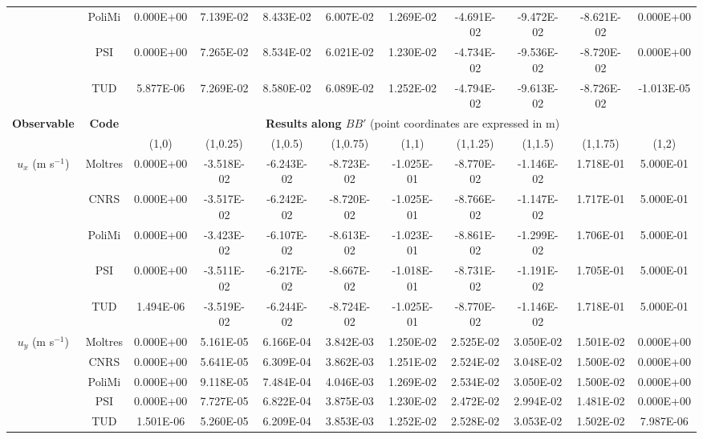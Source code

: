\begin{table}[htbp!]
\begin{tabular}{c c c c c c c c c c c}
        & PoliMi & 0.000E+00 & 7.139E-02 & 8.433E-02 & 6.007E-02 & 1.269E-02 & -4.691E-02 & -9.472E-02 & -8.621E-02 & 0.000E+00 \\
        & PSI & 0.000E+00 & 7.265E-02 & 8.534E-02 & 6.021E-02 & 1.230E-02 & -4.734E-02 & -9.536E-02 & -8.720E-02 & 0.000E+00 \\
        & TUD & 5.877E-06 & 7.269E-02 & 8.580E-02 & 6.089E-02 & 1.252E-02 & -4.794E-02 & -9.613E-02 & -8.726E-02 & -1.013E-05 \\
		\midrule
		\midrule
		\multirow{2}{*}{\textbf{Observable}} & \multirow{2}{*}{\textbf{Code}} & \multicolumn{9}{c}{\textbf{Results along $BB'$} (point coordinates are expressed in m)} \\
		& & {(1,0)} & {(1,0.25)} & {(1,0.5)} & {(1,0.75)} & {(1,1)} & {(1,1.25)} & {(1,1.5)} & {(1,1.75)} & {(1,2)} \\
		\midrule
		\multirow{5}{*}{$u_x$ (m s$^{-1}$)} & Moltres & 0.000E+00 & -3.518E-02 & -6.243E-02 & -8.723E-02 & -1.025E-01 & -8.770E-02 & -1.146E-02 & 1.718E-01 & 5.000E-01 \\
		& CNRS & 0.000E+00 & -3.517E-02 & -6.242E-02 & -8.720E-02 & -1.025E-01 & -8.766E-02 & -1.147E-02 & 1.717E-01 & 5.000E-01 \\
        & PoliMi & 0.000E+00 & -3.423E-02 & -6.107E-02 & -8.613E-02 & -1.023E-01 & -8.861E-02 & -1.299E-02 & 1.706E-01 & 5.000E-01 \\
        & PSI & 0.000E+00 & -3.511E-02 & -6.217E-02 & -8.667E-02 & -1.018E-01 & -8.731E-02 & -1.191E-02 & 1.705E-01 & 5.000E-01 \\
        & TUD & 1.494E-06 & -3.519E-02 & -6.244E-02 & -8.724E-02 & -1.025E-01 & -8.770E-02 & -1.146E-02 & 1.718E-01 & 5.000E-01 \\
        \midrule
		\multirow{5}{*}{$u_y$ (m s$^{-1}$)} & Moltres & 0.000E+00 & 5.161E-05 & 6.166E-04 & 3.842E-03 & 1.250E-02 & 2.525E-02 & 3.050E-02 & 1.501E-02 & 0.000E+00 \\
		& CNRS & 0.000E+00 & 5.641E-05 & 6.309E-04 & 3.862E-03 & 1.251E-02 & 2.524E-02 & 3.048E-02 & 1.500E-02 & 0.000E+00 \\
        & PoliMi & 0.000E+00 & 9.118E-05 & 7.484E-04 & 4.046E-03 & 1.269E-02 & 2.534E-02 & 3.050E-02 & 1.500E-02 & 0.000E+00 \\
        & PSI & 0.000E+00 & 7.727E-05 & 6.822E-04 & 3.875E-03 & 1.230E-02 & 2.472E-02 & 2.994E-02 & 1.481E-02 & 0.000E+00 \\
        & TUD & 1.501E-06 & 5.260E-05 & 6.209E-04 & 3.853E-03 & 1.252E-02 & 2.528E-02 & 3.053E-02 & 1.502E-02 & 7.987E-06 \\
		\bottomrule
	\end{tabular}
\end{table}


